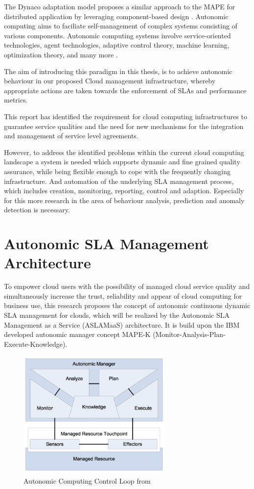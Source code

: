 The Dynaco adaptation model proposes a similar approach to the MAPE for distributed application by leveraging component-based design \citep{buisson2005dynamic} \citep{buisson2006adaptation}. Autonomic computing aims to faciliate self-management of complex systems consisting of various components. Autonomic computing systems involve service-oriented technologies, agent technologies, adaptive control theory, machine learning, optimization theory, and many more \citep{fei2005design} \citep{zhao2009survey}. 
 
The aim of introducing this paradigm in this thesis, is to achieve autonomic behaviour in our proposed Cloud management infrastructure, whereby appropriate actions are taken towards the enforcement of SLAs and performance metrics.

This report has identified the requirement for cloud computing infrastructures to guarantee service qualities and the need for new mechanisms for the integration and management of service level agreements. 


However, to address the identified problems within the current cloud computing landscape a system is needed which supports dynamic and fine grained quality assurance, while being flexible enough to cope with the frequently changing infrastructure. And automation of the underlying SLA management process, which includes creation,  monitoring, reporting, control and adaption. Especially for this more research in the area of behaviour analysis, prediction and anomaly detection is necessary.

\section{Autonomic SLA Management Architecture}
To empower cloud users with the possibility of  managed cloud service quality and simultaneously increase the trust, reliability and appear of cloud computing for business use, this research proposes the concept of autonomic continuous dynamic SLA management for clouds, which will be realized by the Autonomic SLA Management as a Service (ASLAMaaS) architecture. It is build upon the IBM developed autonomic manager concept MAPE-K \cite{MAPE-K} (Monitor-Analysis-Plan-Execute-Knowledge).

\begin{figure}[!ht]
\centering
\includegraphics[width=3in]{chapters/chapter4/fig/MAPE.PNG}
\caption{Autonomic Computing Control Loop from \cite{MAPE-K}}
\label{fig_MAPE}
\end{figure}


